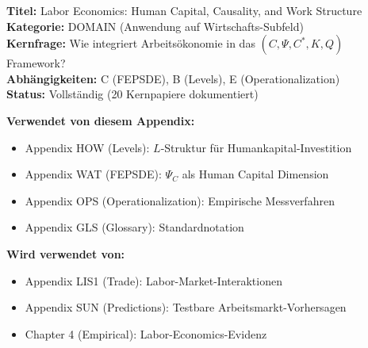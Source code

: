 %


\begin{tcolorbox}[colback=blue!5!white, colframe=blue!75!black, title=\textbf{Appendix MUL1: DOMAIN-LABOR}]
\textbf{Titel:} Labor Economics: Human Capital, Causality, and Work Structure \\
\textbf{Kategorie:} DOMAIN (Anwendung auf Wirtschafts-Subfeld) \\
\textbf{Kernfrage:} Wie integriert Arbeitsökonomie in das $(C, \Psi, C^*, K, Q)$ Framework? \\
\textbf{Abhängigkeiten:} C (FEPSDE), B (Levels), E (Operationalization) \\
\textbf{Status:} Vollständig (20 Kernpapiere dokumentiert)
\end{tcolorbox}

\begin{tcolorbox}[colback=gray!5!white, colframe=gray!75!black, title=\textbf{Cross-Reference Map}]
\small
\textbf{Verwendet von diesem Appendix:}
\begin{itemize}[noitemsep]
    \item Appendix HOW (Levels): $L$-Struktur für Humankapital-Investition
    \item Appendix WAT (FEPSDE): $\Psi_C$ als Human Capital Dimension
    \item Appendix OPS (Operationalization): Empirische Messverfahren
    \item Appendix GLS (Glossary): Standardnotation
\end{itemize}
\textbf{Wird verwendet von:}
\begin{itemize}[noitemsep]
    \item Appendix LIS1 (Trade): Labor-Market-Interaktionen
    \item Appendix SUN (Predictions): Testbare Arbeitsmarkt-Vorhersagen
    \item Chapter 4 (Empirical): Labor-Economics-Evidenz
\end{itemize}
\end{tcolorbox}

